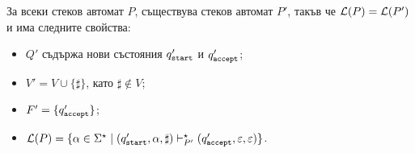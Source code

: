 \begin{prop}
  За всеки стеков автомат $P$,
  съществува стеков автомат $P'$, такъв че $\mathcal{L}(P) = \mathcal{L}(P')$ и има следните свойства:
   \begin{itemize}
   \item
     $Q'$ съдържа нови състояния $q_{\texttt{start}}'$ и $q_{\texttt{accept}}'$;
   \item
     $V' = V \cup \{\sharp\}$, като $\sharp \not\in V$;
   \item
     $F' = \{q_{\texttt{accept}}'\}$;
   \item
     $\mathcal{L}(P) = \{ \alpha \in \Sigma^\star \mid (q_{\texttt{start}}', \alpha, \sharp) \vdash^\star_{P'} (q_{\texttt{accept}}',\varepsilon,\varepsilon)\}$.
   \end{itemize}
\end{prop}

